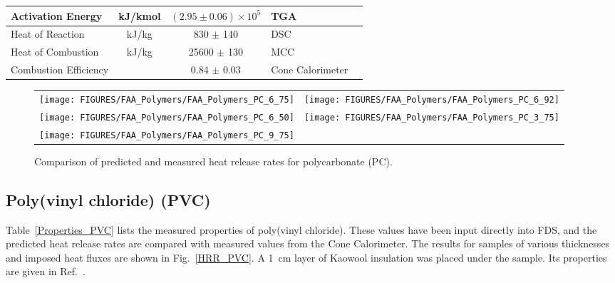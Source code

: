 \begin{table}[h!]
\begin{center}
\begin{tabular}{|l|c|c|l|l|}
Activation Energy           & kJ/kmol       & $(2.95 \pm 0.06) \times 10^{5}$   & TGA                   &  \cite{Stoliarov:CF2010}                  \\ \hline
Heat of Reaction            & kJ/kg         & 830 $\pm$ 140                     & DSC                   &  \cite{Stoliarov:PDS2008}                 \\ \hline
Heat of Combustion          & kJ/kg         & 25600 $\pm$ 130                   & MCC                   &  \cite{Stoliarov:CF2010}                  \\ \hline
Combustion Efficiency       &               & 0.84 $\pm$ 0.03                   & Cone Calorimeter      &  \cite{Stoliarov:CF2010}                  \\ \hline
\end{tabular}
\end{center}
\label{Properties_PC}
\end{table}

\begin{figure}[p]
\begin{tabular*}{\textwidth}{l@{\extracolsep{\fill}}r}
\texttt{[image: FIGURES/FAA\_Polymers/FAA\_Polymers\_PC\_6\_75]} &
\texttt{[image: FIGURES/FAA\_Polymers/FAA\_Polymers\_PC\_6\_92]} \\
\texttt{[image: FIGURES/FAA\_Polymers/FAA\_Polymers\_PC\_6\_50]} &
\texttt{[image: FIGURES/FAA\_Polymers/FAA\_Polymers\_PC\_3\_75]} \\
\texttt{[image: FIGURES/FAA\_Polymers/FAA\_Polymers\_PC\_9\_75]} &
\end{tabular*}
\caption[Heat release rate of polycarbonate (PC).]{Comparison of predicted and measured heat release rates for polycarbonate (PC).}
\label{HRR_PC}
\end{figure}

\clearpage


\subsection{Poly(vinyl chloride) (PVC)}

Table~\ref{Properties_PVC} lists the measured properties of poly(vinyl chloride). These values have been input directly into FDS, and the predicted heat release rates
are compared with measured values from the Cone
Calorimeter. The results for samples of various thicknesses and imposed heat fluxes are shown in Fig.~\ref{HRR_PVC}.
A 1~cm layer of Kaowool insulation was placed under the sample. Its properties are given in Ref.~\cite{Stoliarov:CF2010}.

